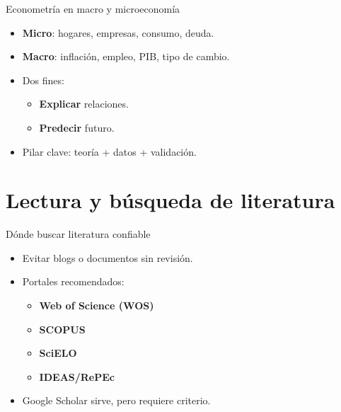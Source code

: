 \documentclass[aspectratio=169,10pt]{beamer}
\begin{document}
\begin{frame}{Econometría en macro y microeconomía}
  \begin{itemize}
    \item \textbf{Micro}: hogares, empresas, consumo, deuda.
    \item \textbf{Macro}: inflación, empleo, PIB, tipo de cambio.
    \item Dos fines:
      \begin{itemize}
        \item \textbf{Explicar} relaciones.
        \item \textbf{Predecir} futuro.
      \end{itemize}
    \item Pilar clave: teoría + datos + validación.
  \end{itemize}
\end{frame}


\section{Lectura y búsqueda de literatura}

\begin{frame}{Dónde buscar literatura confiable}
  \begin{itemize}
    \item Evitar blogs o documentos sin revisión.
    \item Portales recomendados:
      \begin{itemize}
        \item \textbf{Web of Science (WOS)}
        \item \textbf{SCOPUS}
        \item \textbf{SciELO}
        \item \textbf{IDEAS/RePEc}
      \end{itemize}
    \item Google Scholar sirve, pero requiere criterio.
  \end{itemize}
\end{frame}
\end{document}
